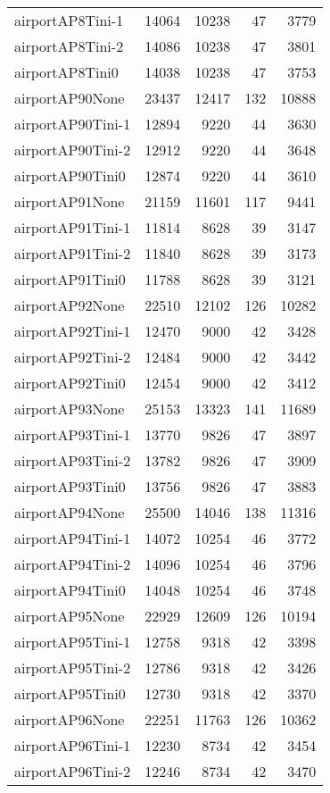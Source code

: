 \begin{longtable}{lrrrr}
airportAP8Tini-1 & 14064 & 10238 & 47 & 3779 \\
airportAP8Tini-2 & 14086 & 10238 & 47 & 3801 \\
airportAP8Tini0 & 14038 & 10238 & 47 & 3753 \\
airportAP90None & 23437 & 12417 & 132 & 10888 \\
airportAP90Tini-1 & 12894 & 9220 & 44 & 3630 \\
airportAP90Tini-2 & 12912 & 9220 & 44 & 3648 \\
airportAP90Tini0 & 12874 & 9220 & 44 & 3610 \\
airportAP91None & 21159 & 11601 & 117 & 9441 \\
airportAP91Tini-1 & 11814 & 8628 & 39 & 3147 \\
airportAP91Tini-2 & 11840 & 8628 & 39 & 3173 \\
airportAP91Tini0 & 11788 & 8628 & 39 & 3121 \\
airportAP92None & 22510 & 12102 & 126 & 10282 \\
airportAP92Tini-1 & 12470 & 9000 & 42 & 3428 \\
airportAP92Tini-2 & 12484 & 9000 & 42 & 3442 \\
airportAP92Tini0 & 12454 & 9000 & 42 & 3412 \\
airportAP93None & 25153 & 13323 & 141 & 11689 \\
airportAP93Tini-1 & 13770 & 9826 & 47 & 3897 \\
airportAP93Tini-2 & 13782 & 9826 & 47 & 3909 \\
airportAP93Tini0 & 13756 & 9826 & 47 & 3883 \\
airportAP94None & 25500 & 14046 & 138 & 11316 \\
airportAP94Tini-1 & 14072 & 10254 & 46 & 3772 \\
airportAP94Tini-2 & 14096 & 10254 & 46 & 3796 \\
airportAP94Tini0 & 14048 & 10254 & 46 & 3748 \\
airportAP95None & 22929 & 12609 & 126 & 10194 \\
airportAP95Tini-1 & 12758 & 9318 & 42 & 3398 \\
airportAP95Tini-2 & 12786 & 9318 & 42 & 3426 \\
airportAP95Tini0 & 12730 & 9318 & 42 & 3370 \\
airportAP96None & 22251 & 11763 & 126 & 10362 \\
airportAP96Tini-1 & 12230 & 8734 & 42 & 3454 \\
airportAP96Tini-2 & 12246 & 8734 & 42 & 3470 \\

\end{longtable}
